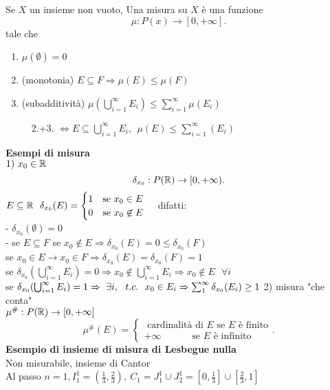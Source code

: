 \documentclass[12px]{article}
\begin{document}
  \begin{defi}
  	Se $X$ un insieme non vuoto, Una misura su $X $ è una funzione 
	\[
		\mu: P(x) \rightarrow [0,+\infty]
	.\] 
	tale che
	\begin{enumerate}
		\item $\mu(\emptyset) = 0$
		\item (monotonia) $E \subseteq F \Rightarrow \mu(E) \leq \mu(F) $
		\item (subadditività) $\mu( \bigcup^{\infty}_{i=1}E_i)\leq \sum^{\infty}_{i=1}\mu(E_i)$ 
		\item[\text{} \ \ 2.+3.] $ \Leftrightarrow E\subseteq \bigcup^{\infty}_{i=1} E_i, \ \ \mu(E)\leq \sum^{\infty}_{i=1}(E_i)$
	\end{enumerate}
  \end{defi}
\textbf{Esempi di misura}\\
$1)\ x_0 \in\mathbb{R}$
\[
	\delta_{x_0}: P(\mathbb{R}) \rightarrow [0,+\infty)
.\] 
$E\subseteq \mathbb{R} \ \ \delta_{x_0}(E) = \begin{cases}
	1\ \ \ \text {se } x_0\in E\\
	0 \ \ \ \text{se }  x_0\not\in E
\end{cases}$
difatti:\\
- $\delta_{x_0}(\emptyset) = 0$\\
- se  $E\subseteq F$ se  $x_0\not\in E \Rightarrow \delta_{x_0}(E) = 0 \leq \delta_{x_0}(F)$ \\
se $x_0\in E \rightarrow x_0 \in F \Rightarrow \delta_{x_0}(E)=\delta_{x_0}(F) = 1 $\\
se $\delta_{x_0}( \bigcup^{\infty}_{i=1}E_i) = 0 \Rightarrow x_0\not\in \bigcup^{\infty}_{i=1}E_i \Rightarrow x_0\not\in E \ \ \ \forall i$ \\
se $\delta_{x_0}( \bigcup^{\infty}_{i=1}E_i) = 1 \Rightarrow \ \exists i, \ \ t.c. \ \ x_0\in E_i \Rightarrow \sum^{\infty}_{1}\delta_{x_0}(E_i)\geq 1\\$
2) misura "che conta"\\
$\mu^\# : P(\mathbb{R}) \rightarrow[0,+\infty] $\\
\[
 \mu^\# (E) = \begin{cases}
	 \text{ cardinalità di } E \text { se } E \text{ è finito}\\
	 +\infty \ \ \ \ \ \ \ \ \ \ \ \ \  \text{ se } E \text { è infinito}
 \end{cases}
.\] 
\textbf{Esempio di insieme di misura di Lesbegue nulla}\\
Non misurabile, insieme di Cantor\\
Al passo $n=1, I_1^1 = (\frac 13, \frac 23), \ C_1= J^1_1 \cup J^1_2 = [0,\frac 13] \cup [\frac 23, 1]$\\
\end{document}
